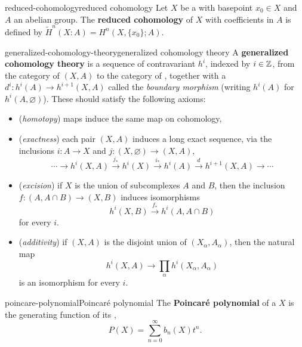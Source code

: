\begin{topic}{reduced-cohomology}{reduced cohomology}
    Let $X$ be a  with basepoint $x_0 \in X$ and $A$ an abelian group. The \textbf{reduced cohomology} of $X$ with coefficients in $A$ is defined by $\tilde{H}^n(X: A) = H^n(X, \{ x_0 \}; A)$.
\end{topic}

\begin{topic}{generalized-cohomology-theory}{generalized cohomology theory}
    A \textbf{generalized cohomology theory} is a sequence of contravariant  $h^i$, indexed by $i \in \mathbb{Z}$, from the category of  $(X, A)$ to the category of , together with a  $d^i : h^i(A) \to h^{i + 1}(X, A)$ called the \textit{boundary morphism} (writing $h^i(A)$ for $h^i(A, \varnothing)$). These should satisfy the following axioms:
    \begin{itemize}
        \item (\textit{homotopy})  maps induce the same map on cohomology,
        \item (\textit{exactness}) each pair $(X, A)$ induces a long exact sequence, via the inclusions $i : A \to X$ and $j : (X, \varnothing) \to (X, A)$,
        \[ \cdots \rightarrow h^i(X, A) \xrightarrow{j_*} h^i(X) \xrightarrow{i_*} h^i(A) \xrightarrow{d} h^{i + 1}(X, A) \rightarrow \cdots \]
        \item (\textit{excision}) if $X$ is the union of subcomplexes $A$ and $B$, then the inclusion $f : (A, A \cap B) \to (X, B)$ induces isomorphisms
        \[ h^i(X, B) \xrightarrow{f_*} h^i(A, A \cap B) \]
        for every $i$.
        \item (\textit{additivity}) if $(X, A)$ is the disjoint union of $(X_\alpha, A_\alpha)$, then the natural map
        \[ h^i(X, A) \to \prod_\alpha h^i(X_\alpha, A_\alpha) \]
        is an isomorphism for every $i$.
    \end{itemize}
\end{topic}

\begin{topic}{poincare-polynomial}{Poincaré polynomial}
    The \textbf{Poincaré polynomial} of a  $X$ is the generating function of its ,
    \[ P(X) = \sum_{n = 0}^\infty b_n(X) t^n . \]
\end{topic}


